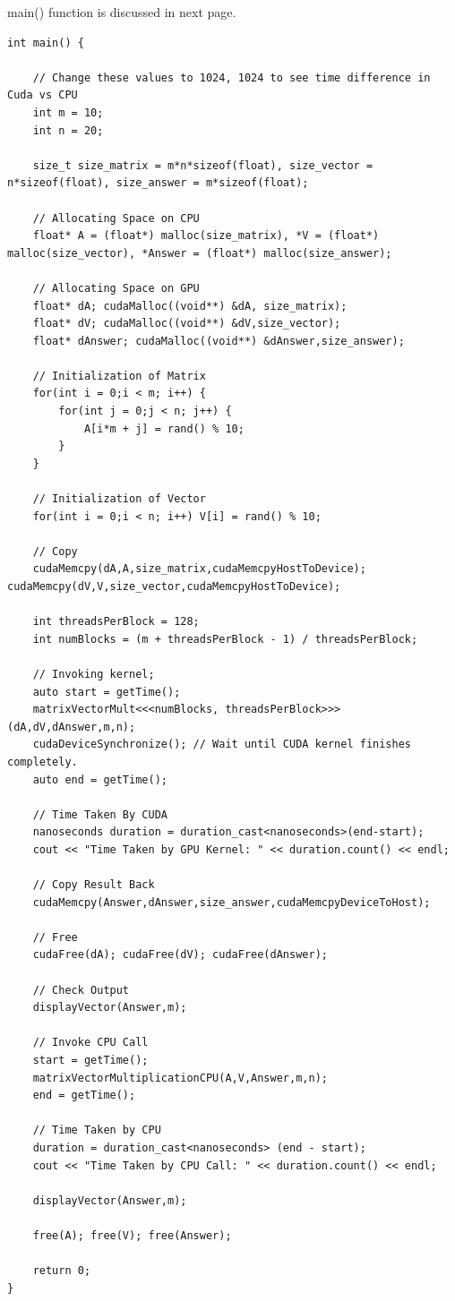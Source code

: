 \documentclass{article}
\begin{document}
main() function is discussed in next page.

\newpage

\begin{lstlisting}
int main() {

    // Change these values to 1024, 1024 to see time difference in Cuda vs CPU
    int m = 10;
    int n = 20;

    size_t size_matrix = m*n*sizeof(float), size_vector = n*sizeof(float), size_answer = m*sizeof(float);

    // Allocating Space on CPU
    float* A = (float*) malloc(size_matrix), *V = (float*) malloc(size_vector), *Answer = (float*) malloc(size_answer);

    // Allocating Space on GPU
    float* dA; cudaMalloc((void**) &dA, size_matrix);
    float* dV; cudaMalloc((void**) &dV,size_vector);
    float* dAnswer; cudaMalloc((void**) &dAnswer,size_answer);

    // Initialization of Matrix
    for(int i = 0;i < m; i++) {
        for(int j = 0;j < n; j++) {
            A[i*m + j] = rand() % 10;
        }
    }

    // Initialization of Vector
    for(int i = 0;i < n; i++) V[i] = rand() % 10;

    // Copy
    cudaMemcpy(dA,A,size_matrix,cudaMemcpyHostToDevice); cudaMemcpy(dV,V,size_vector,cudaMemcpyHostToDevice);

    int threadsPerBlock = 128;
    int numBlocks = (m + threadsPerBlock - 1) / threadsPerBlock;
    
    // Invoking kernel;
    auto start = getTime();
    matrixVectorMult<<<numBlocks, threadsPerBlock>>> (dA,dV,dAnswer,m,n);
    cudaDeviceSynchronize(); // Wait until CUDA kernel finishes completely.
    auto end = getTime();

    // Time Taken By CUDA
    nanoseconds duration = duration_cast<nanoseconds>(end-start);
    cout << "Time Taken by GPU Kernel: " << duration.count() << endl;

    // Copy Result Back
    cudaMemcpy(Answer,dAnswer,size_answer,cudaMemcpyDeviceToHost);

    // Free
    cudaFree(dA); cudaFree(dV); cudaFree(dAnswer);

    // Check Output
    displayVector(Answer,m);

    // Invoke CPU Call
    start = getTime();
    matrixVectorMultiplicationCPU(A,V,Answer,m,n);
    end = getTime();

    // Time Taken by CPU
    duration = duration_cast<nanoseconds> (end - start);
    cout << "Time Taken by CPU Call: " << duration.count() << endl;

    displayVector(Answer,m);

    free(A); free(V); free(Answer);

    return 0;
}   

\end{lstlisting}
\end{document}
